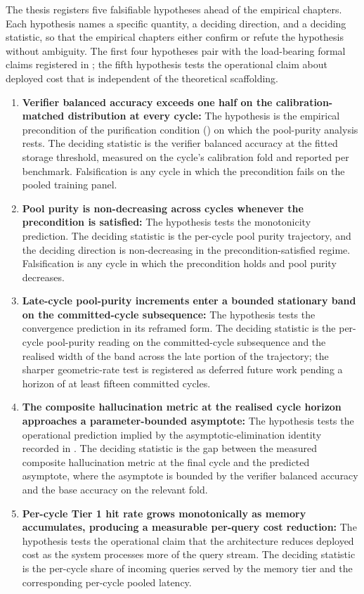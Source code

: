 The thesis registers five falsifiable hypotheses ahead of the empirical chapters. Each hypothesis names a specific quantity, a deciding direction, and a deciding statistic, so that the empirical chapters either confirm or refute the hypothesis without ambiguity. The first four hypotheses pair with the load-bearing formal claims registered in ; the fifth hypothesis tests the operational claim about deployed cost that is independent of the theoretical scaffolding.

\begin{enumerate}
\item \textbf{Verifier balanced accuracy exceeds one half on the calibration-matched distribution at every cycle:} The hypothesis is the empirical precondition of the purification condition () on which the pool-purity analysis rests. The deciding statistic is the verifier balanced accuracy at the fitted storage threshold, measured on the cycle's calibration fold and reported per benchmark. Falsification is any cycle in which the precondition fails on the pooled training panel.

\item \textbf{Pool purity is non-decreasing across cycles whenever the precondition is satisfied:} The hypothesis tests the monotonicity prediction. The deciding statistic is the per-cycle pool purity trajectory, and the deciding direction is non-decreasing in the precondition-satisfied regime. Falsification is any cycle in which the precondition holds and pool purity decreases.

\item \textbf{Late-cycle pool-purity increments enter a bounded stationary band on the committed-cycle subsequence:} The hypothesis tests the convergence prediction in its reframed form. The deciding statistic is the per-cycle pool-purity reading on the committed-cycle subsequence and the realised width of the band across the late portion of the trajectory; the sharper geometric-rate test is registered as deferred future work pending a horizon of at least fifteen committed cycles.

\item \textbf{The composite hallucination metric at the realised cycle horizon approaches a parameter-bounded asymptote:} The hypothesis tests the operational prediction implied by the asymptotic-elimination identity recorded in . The deciding statistic is the gap between the measured composite hallucination metric at the final cycle and the predicted asymptote, where the asymptote is bounded by the verifier balanced accuracy and the base accuracy on the relevant fold.

\item \textbf{Per-cycle Tier 1 hit rate grows monotonically as memory accumulates, producing a measurable per-query cost reduction:} The hypothesis tests the operational claim that the architecture reduces deployed cost as the system processes more of the query stream. The deciding statistic is the per-cycle share of incoming queries served by the memory tier and the corresponding per-cycle pooled latency.
\end{enumerate}

